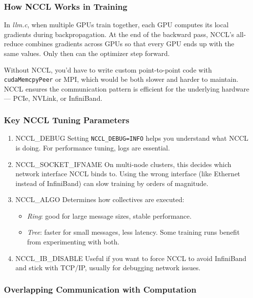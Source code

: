 \documentclass[
  letterpaper,
  DIV=11,
  numbers=noendperiod]{scrreprt}
\providecommand{\tightlist}{%
  \setlength{\itemsep}{0pt}\setlength{\parskip}{0pt}}
\begin{document}
\subsubsection{How NCCL Works in
Training}\label{how-nccl-works-in-training}

In \emph{llm.c}, when multiple GPUs train together, each GPU computes
its local gradients during backpropagation. At the end of the backward
pass, NCCL's all-reduce combines gradients across GPUs so that every GPU
ends up with the same values. Only then can the optimizer step forward.

Without NCCL, you'd have to write custom point-to-point code with
\texttt{cudaMemcpyPeer} or MPI, which would be both slower and harder to
maintain. NCCL ensures the communication pattern is efficient for the
underlying hardware --- PCIe, NVLink, or InfiniBand.

\subsubsection{Key NCCL Tuning
Parameters}\label{key-nccl-tuning-parameters}

\begin{enumerate}
\def\labelenumi{\arabic{enumi}.}
\item
  NCCL\_DEBUG Setting \texttt{NCCL\_DEBUG=INFO} helps you understand
  what NCCL is doing. For performance tuning, logs are essential.
\item
  NCCL\_SOCKET\_IFNAME On multi-node clusters, this decides which
  network interface NCCL binds to. Using the wrong interface (like
  Ethernet instead of InfiniBand) can slow training by orders of
  magnitude.
\item
  NCCL\_ALGO Determines how collectives are executed:

  \begin{itemize}
  \tightlist
  \item
    \emph{Ring}: good for large message sizes, stable performance.
  \item
    \emph{Tree}: faster for small messages, less latency. Some training
    runs benefit from experimenting with both.
  \end{itemize}
\item
  NCCL\_IB\_DISABLE Useful if you want to force NCCL to avoid InfiniBand
  and stick with TCP/IP, usually for debugging network issues.
\end{enumerate}

\subsubsection{Overlapping Communication with
Computation}\label{overlapping-communication-with-computation}
\end{document}

